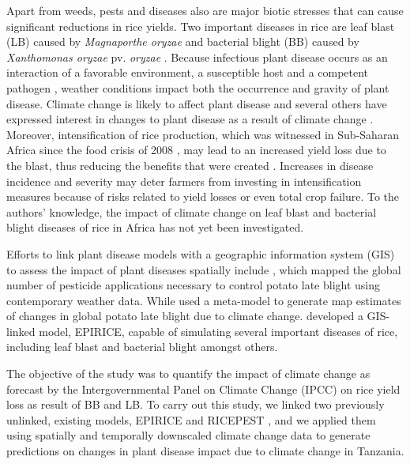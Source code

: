 \documentclass[preprint,review,12pt]{elsarticle}
\begin{document}
    Apart from weeds, pests and diseases also are major biotic stresses that can cause significant reductions in rice yields. Two important diseases in rice are leaf blast (LB) caused by \textit{Magnaporthe oryzae} and bacterial blight (BB) caused by \textit{Xanthomonas oryzae} pv. \textit{oryzae} \cite{Verdier2012}. Because infectious plant disease occurs as an interaction of a favorable environment, a susceptible host and a competent pathogen \cite{Madden2007}, weather conditions impact both the occurrence and gravity of plant disease. Climate change is likely to affect plant disease \cite{Anderson2004, Coakley1999, Garrett2006} and several others have expressed interest in changes to plant disease as a result of climate change \cite{Chakraborty2011, Juroszek2011, Luck2011, Pautasso2010, Savary2011, Sutherst2011}. Moreover, intensification of rice production, which was witnessed in Sub-Saharan Africa since the food crisis of 2008 \cite{Saito2013}, may lead to an increased yield loss due to the blast, thus reducing the benefits that were created \cite{Sere2013}. Increases in disease incidence and severity may deter farmers from investing in intensification measures because of risks related to yield losses or even total crop failure. To the authors' knowledge, the impact of climate change on leaf blast and bacterial blight diseases of rice in Africa has not yet been investigated.
    
    Efforts to link plant disease models with a geographic information system (GIS) to assess the impact of plant diseases spatially include  \citet{Hijmans2000}, which mapped the global number of pesticide applications necessary to control potato late blight using contemporary weather data. While \citet{Sparks2014} used a meta-model to generate map estimates of changes in global potato late blight due to climate change. \citet{Savary2012} developed a GIS-linked model, EPIRICE, capable of simulating several important diseases of rice, including leaf blast and bacterial blight amongst others.
    
    The objective of the study was to quantify the impact of climate change as forecast by the Intergovernmental Panel on Climate Change (IPCC) on rice yield loss as result of BB and LB. To carry out this study, we linked two previously unlinked, existing models, EPIRICE and RICEPEST \cite{Willocquet2000, Willocquet2002}, and we applied them using spatially and temporally downscaled climate change data to generate predictions on changes in plant disease impact due to climate change in Tanzania.
    
\end{document}
